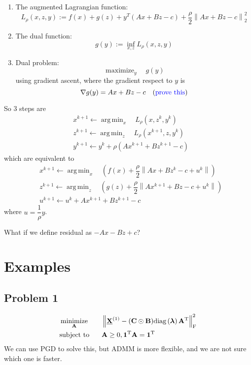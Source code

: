 \documentclass[11pt,a4paper]{article}
\def\blue{\color{blue}}
\newcommand{\norm}[1]{\left\lVert#1\right\rVert}
\newcommand{\diag}[1]{\text{diag}\left(#1\right)}
\DeclareMathOperator*{\argmin}{arg\,min}
\DeclareMathOperator*{\minimize}{minimize}
\DeclareMathOperator*{\maximize}{maximize}
\theoremstyle{plain}
\theoremstyle{definition}
\theoremstyle{remark}
\begin{document}
\begin{enumerate}
    \item The augmented Lagrangian function:
        \[
        L_\rho(x, z, y) := f(x) + g(z) + y^T (Ax + Bz - c) + \dfrac{\rho}{2} \norm{Ax + Bz - c}_2^2
        \] 
    \item The dual function:
        \[
        g(y) := \inf_{x, z} L_\rho(x, z, y)
        \] 
    \item Dual problem:
        \[
        \maximize_{y} \quad g(y)
        \] 
        using gradient ascent, where the gradient respect to $y$ is 
         \[
        \nabla g(y) = Ax + Bz - c \quad \text{({\blue prove this})}
        \] 
\end{enumerate}
So 3 steps are
\begin{align*}
    & x^{k+1} \leftarrow \argmin_{x} \quad L_{\rho} (x, z^{k}, y^{k}) \\
    & z^{k+1} \leftarrow \argmin_{z} \quad L_{\rho} (x^{k+1}, z, y^{k}) \\
    & y^{k+1} \leftarrow y^{k} + \rho (Ax^{k+1} + Bz^{k+1} - c)
\end{align*}
which are equivalent to
\begin{align*}
    & x^{k+1} \leftarrow \argmin_{x} \quad \left(  f(x) + \dfrac{\rho}{2} \norm{Ax +Bz^{k} -c + u^{k}} \right)\\
    & z^{k+1} \leftarrow \argmin_{z} \quad \left(  g(z) + \dfrac{\rho}{2} \norm{Ax^{k+1} + Bz -c + u^{k}} \right)\\
    & u^{k+1} \leftarrow u^{k} + Ax^{k+1} + Bz^{k+1} - c
\end{align*}
where $u = \dfrac{1}{\rho} y$.

{\blue What if we define residual as $-Ax - Bz + c$?}
\section{Examples}%
\label{sec:examples}

\subsection{Problem 1}%
\label{sub:problem_1}

\begin{alignat*}{2}
    & \minimize_{\mathbf{A}} \quad && \norm{\underline{\mathbf{X}}^{(1)} - (\mathbf{C} \odot \mathbf{B}) \diag{\boldsymbol  \lambda} \mathbf{A}^{\rm T} }_{\rm F}^2 \\
    & \text{subject to} && \mathbf{A} \geq 0,  \mathbf{1}^{\rm T} \mathbf{A} = \mathbf{1}^{\rm T} 
\end{alignat*}
We can use PGD to solve this, but ADMM is more flexible, and we are not sure which one is faster.
\end{document}
